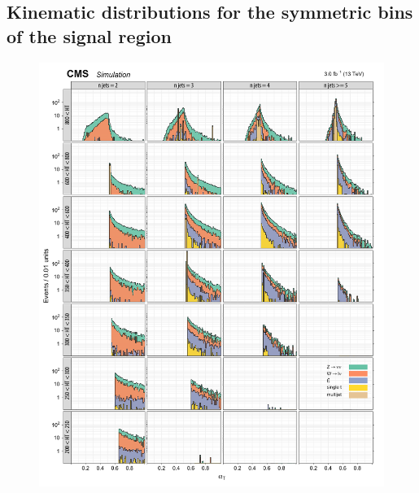 \subsection{Kinematic distributions for the symmetric \njet bins of the signal region}


\begin{figure}[!h]
\centering
\includegraphics[scale=0.95]{figures/kiplots/c150107_s150318_f015_alphaT_100}
\end{figure}

